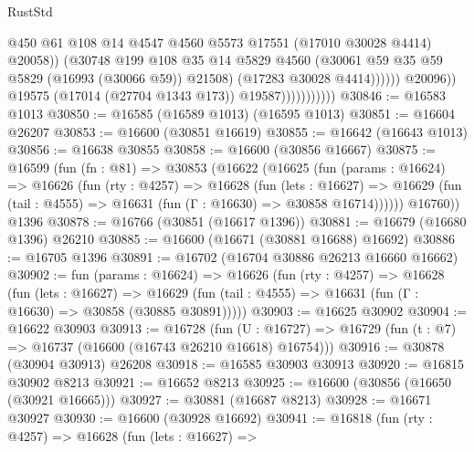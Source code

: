 \begin{lexlean}{RustStd}
\begin{coremodule}
{\begin{coremodule}
{{{{{{{{{{{{{{{{{{{{{{{{{{{{{{{{{{{{{{{{{{{{{{{{{{{{{{{                                          @450
                                          @61
                                          @108
                                          @14
                                          @4547
                                          @4560
                                          @5573
                                          @17551
                                          (@17010 @30028 @4414)
                                          @20058))
                                      (@30748
                                        @199
                                        @108
                                        @35
                                        @14
                                        @5829
                                        @4560
                                        (@30061 @59 @35 @59 @5829 (@16993 (@30066 @59)) @21508)
                                        (@17283 @30028 @4414))))))
                              @20096))
                          @19575
                          (@17014 (@27704 @1343 @173))
                          @19587)))))))))))
@30846 := @16583 @1013
@30850 := @16585 (@16589 @1013) (@16595 @1013)
@30851 := @16604 @26207
@30853 := @16600 (@30851 @16619)
@30855 := @16642 (@16643 @1013)
@30856 := @16638 @30855
@30858 := @16600 (@30856 @16667)
@30875 := @16599
    (fun (fn : @81) =>
    @30853
      (@16622
        (@16625
          (fun (params : @16624) =>
          @16626
            (fun (rty : @4257) =>
            @16628
              (fun (lets : @16627) =>
              @16629 (fun (tail : @4555) => @16631 (fun (Γ : @16630) => @30858 @16714))))))
        @16760))
    @1396
@30878 := @16766 (@30851 (@16617 @1396))
@30881 := @16679 (@16680 @1396) @26210
@30885 := @16600 (@16671 (@30881 @16688) @16692)
@30886 := @16705 @1396
@30891 := @16702 (@16704 @30886 @26213 @16660 @16662)
@30902 := fun (params : @16624) =>
  @16626
    (fun (rty : @4257) =>
    @16628
      (fun (lets : @16627) =>
      @16629 (fun (tail : @4555) => @16631 (fun (Γ : @16630) => @30858 (@30885 @30891)))))
@30903 := @16625 @30902
@30904 := @16622 @30903
@30913 := @16728
    (fun (U : @16727) => @16729 (fun (t : @7) => @16737 (@16600 (@16743 @26210 @16618) @16754)))
@30916 := @30878 (@30904 @30913) @26208
@30918 := @16585 @30903 @30913
@30920 := @16815 @30902 @8213
@30921 := @16652 @8213
@30925 := @16600 (@30856 (@16650 (@30921 @16665)))
@30927 := @30881 (@16687 @8213)
@30928 := @16671 @30927
@30930 := @16600 (@30928 @16692)
@30941 := @16818
    (fun (rty : @4257) =>
    @16628
      (fun (lets : @16627) =>
}}}}}}}}}}}}}}}}}}}}}}}}}}}}}}}}}}}}}}}}}}}}}}}}}}}}}}}
\end{coremodule}}
\end{coremodule}
\end{lexlean}
